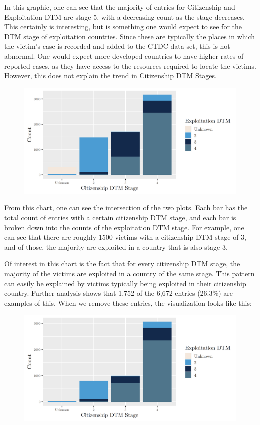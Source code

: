 \documentclass{article} %
\begin{document}
In this graphic, one can see that the majority of entries for Citizenship and Exploitation DTM are stage 5, with a decreasing count as the stage decreases. This certainly is interesting, but is something one would expect to see for the DTM stage of exploitation countries. Since these are typically the places in which the victim's case is recorded and added to the CTDC data set, this is not abnormal. One would expect more developed countries to have higher rates of reported cases, as they have access to the resources required to locate the victims. However, this does not explain the trend in Citizenship DTM Stages.
\FloatBarrier
\begin{figure}[H]
	\includegraphics[width = \textwidth]{DTMStage1}
\end{figure}
\FloatBarrier


From this chart, one can see the intersection of the two plots. Each bar has the total count of entries with a certain citizenship DTM stage, and each bar is broken down into the counts of the exploitation DTM stage. For example, one can see that there are roughly 1500 victims with a citizenship DTM stage of 3, and of those, the majority are exploited in a country that is also stage 3.

Of interest in this chart is the fact that for every citizenship DTM stage, the majority of the victims are exploited in a country of the same stage. This pattern can easily be explained by victims typically being exploited in their citizenship country. Further analysis shows that 1,752 of the 6,672 entries (26.3\%) are examples of this. When we remove these entries, the visualization looks like this:

\FloatBarrier
\begin{figure}[H]
	\includegraphics[width = \textwidth]{Different_CountryDTM}
\end{figure}
\FloatBarrier
\end{document}

